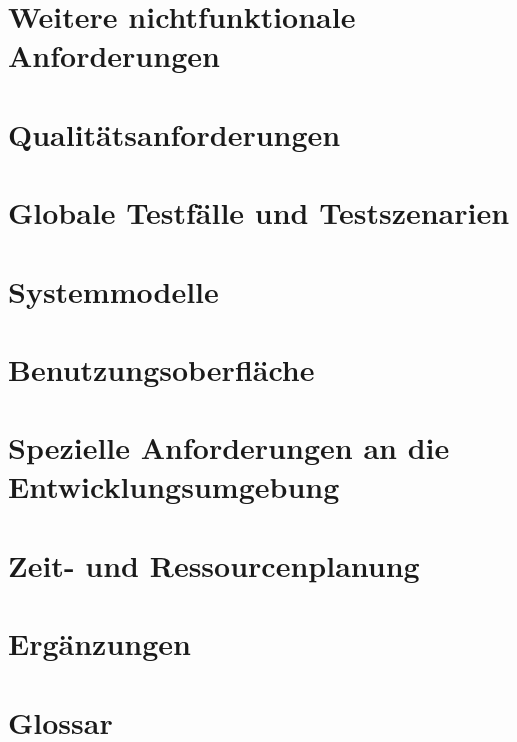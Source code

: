 \documentclass[a4paper,10pt]{article}
\begin{document}
\section{Weitere nichtfunktionale Anforderungen}
\section{Qualitätsanforderungen}
\section{Globale Testfälle und Testszenarien}
\section{Systemmodelle}
\section{Benutzungsoberfläche}
\section{Spezielle Anforderungen an die Entwicklungsumgebung}
\section{Zeit- und Ressourcenplanung}
\section{Ergänzungen}
\section{Glossar}
\end{document}

